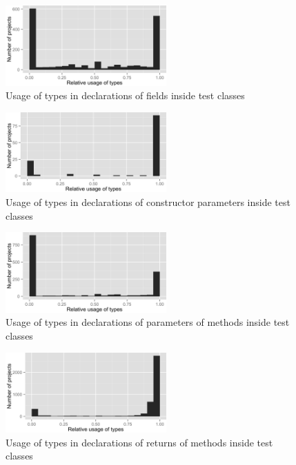 \begin{figure}[h]
\centering 
\includegraphics[width=0.55\textwidth]{../aosd_2014/analysis/result/test/test/histograms/10_Field.png} 
\caption{Usage of types in declarations of fields inside test classes}
\end{figure}

\begin{figure}[h]
\centering 
\includegraphics[width=0.55\textwidth]{../aosd_2014/analysis/result/test/test/histograms/9_Constructor_Parameter.png} 
\caption{Usage of types in declarations of constructor parameters inside test classes}
\end{figure}

\begin{figure}[h]
\centering 
\includegraphics[width=0.55\textwidth]{../aosd_2014/analysis/result/test/test/histograms/8_Method_Parameter.png} 
\caption{Usage of types in declarations of parameters of methods inside test classes}
\end{figure}

\begin{figure}[h]
\centering 
\includegraphics[width=0.55\textwidth]{../aosd_2014/analysis/result/test/test/histograms/7_Method_Return.png} 
\caption{Usage of types in declarations of returns of methods inside test classes}
\end{figure}

